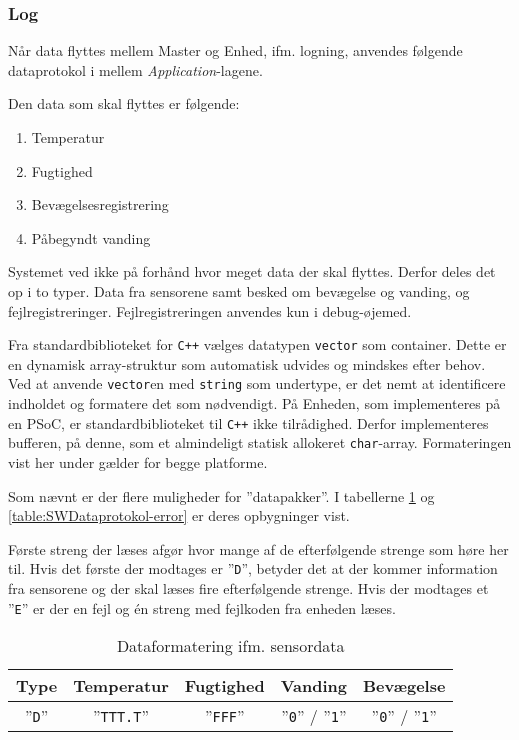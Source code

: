 
\subsubsection{Log}

Når data flyttes mellem Master og Enhed, ifm. logning, anvendes følgende dataprotokol i mellem \textit{Application}-lagene.

Den data som skal flyttes er følgende:

\begin{enumerate}
	\item Temperatur
	\item Fugtighed
	\item Bevægelsesregistrering
	\item Påbegyndt vanding
\end{enumerate}

Systemet ved ikke på forhånd hvor meget data der skal flyttes. Derfor deles det op i to typer. Data fra sensorene samt besked om bevægelse og vanding, og fejlregistreringer. Fejlregistreringen anvendes kun i debug-øjemed.

Fra standardbiblioteket for \verb'C++' vælges datatypen \verb+vector+ som container. Dette er en dynamisk array-struktur som automatisk udvides og mindskes efter behov.
Ved at anvende \verb+vector+en med \verb+string+ som undertype, er det nemt at identificere indholdet og formatere det som nødvendigt. På Enheden, som implementeres på en PSoC, er standardbiblioteket til \verb-C++- ikke tilrådighed. Derfor implementeres bufferen, på denne, som et almindeligt statisk allokeret \verb+char+-array. Formateringen vist her under gælder for begge platforme.

Som nævnt er der flere muligheder for ''datapakker''. I tabellerne \ref{table:SWDataprotokol-sensor} og \ref{table:SWDataprotokol-error} er deres opbygninger vist.

Første streng der læses afgør hvor mange af de efterfølgende strenge som høre her til. Hvis det første der modtages er ''\verb+D+'', betyder det at der kommer information fra sensorene og der skal læses fire efterfølgende strenge.
Hvis der modtages et ''\verb+E+'' er der en fejl og én streng med fejlkoden fra enheden læses.

\begin{table}[h]
	\caption{Dataformatering ifm. sensordata}
	\centering
	\begin{tabular}{|c|c|c|c|c|}
		\hline 
		\textbf{Type} & \textbf{Temperatur} & \textbf{Fugtighed} & \textbf{Vanding} & \textbf{Bevægelse}\\ 
		\hline 
		''\verb+D+'' & ''\verb+TTT.T+'' & ''\verb+FFF+'' & ''\verb+0+'' / ''\verb+1+'' & ''\verb+0+'' / ''\verb+1+'' \\ 
		\hline 
	\end{tabular} 
	\label{table:SWDataprotokol-sensor}
\end{table}

